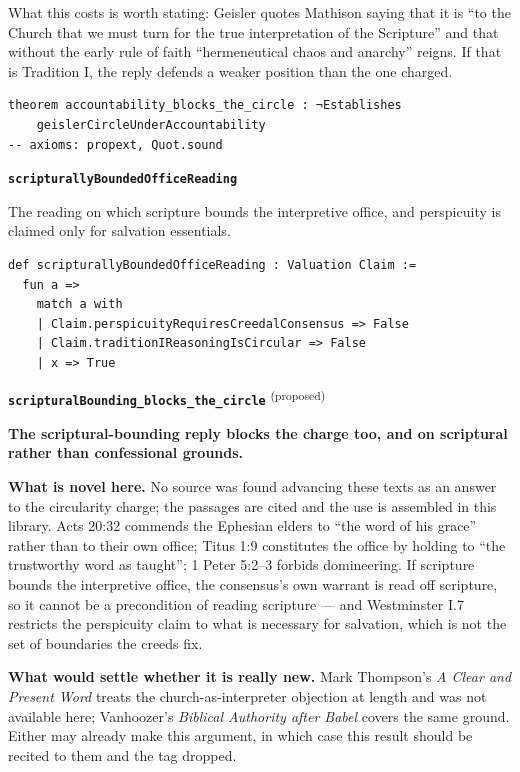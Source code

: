 \documentclass[11pt]{article}
\begin{document}
What this costs is worth stating: Geisler quotes Mathison saying that it is “to the Church that we must turn for the true interpretation of the Scripture” and that without the early rule of faith “hermeneutical chaos and anarchy” reigns. If that is Tradition I, the reply defends a weaker position than the one charged.

{\small\begin{verbatim}
theorem accountability_blocks_the_circle : ¬Establishes
    geislerCircleUnderAccountability
-- axioms: propext, Quot.sound
\end{verbatim}}
\par\medskip\noindent\textbf{\texttt{scripturally\allowbreak{}Bounded\allowbreak{}Office\allowbreak{}Reading}}\par\nobreak\noindent
The reading on which scripture bounds the interpretive office, and perspicuity is claimed only for salvation essentials.

{\small\begin{verbatim}
def scripturallyBoundedOfficeReading : Valuation Claim :=
  fun a =>
    match a with
    | Claim.perspicuityRequiresCreedalConsensus => False
    | Claim.traditionIReasoningIsCircular => False
    | x => True
\end{verbatim}}
\par\medskip\noindent\textbf{\texttt{scriptural\allowbreak{}Bounding\_\allowbreak{}blocks\_\allowbreak{}the\_\allowbreak{}circle}} \textsuperscript{(proposed)}\par\nobreak\noindent
\textbf{The scriptural-bounding reply blocks the charge too, and on scriptural rather than confessional grounds.}

\textbf{What is novel here.} No source was found advancing these texts as an answer to the circularity charge; the passages are cited and the use is assembled in this library. Acts 20:32 commends the Ephesian elders to “the word of his grace” rather than to their own office; Titus 1:9 constitutes the office by holding to “the trustworthy word as taught”; 1 Peter 5:2–3 forbids domineering. If scripture bounds the interpretive office, the consensus’s own warrant is read off scripture, so it cannot be a precondition of reading scripture — and Westminster I.7 restricts the perspicuity claim to what is necessary for salvation, which is not the set of boundaries the creeds fix.

\textbf{What would settle whether it is really new.} Mark Thompson’s \emph{A Clear and Present Word} treats the church-as-interpreter objection at length and was not available here; Vanhoozer’s \emph{Biblical Authority after Babel} covers the same ground. Either may already make this argument, in which case this result should be recited to them and the tag dropped.
\end{document}
